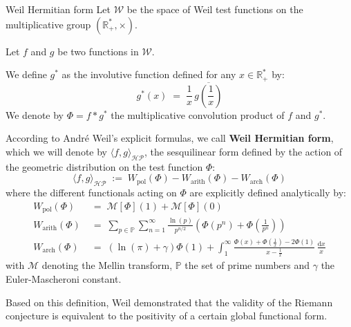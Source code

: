 \documentclass[Riemann_Hypothesis.tex]{subfiles}
\begin{document}
\begin{DefNefEn}[label=df:FormeHermitienneWeil_intro]{Weil Hermitian form}
    Let $\mathcal{W}$ be the space of Weil test functions on the multiplicative 
    group $\left(\mathbb{R}_+^*, \times\right)$. \par
    Let $f$ and $g$ be two functions in $\mathcal{W}$. \par
    We define $g^*$ as the involutive function defined for any $x \in \mathbb{R}_+^*$ by:
    \begin{equation*}
        g^*(x) \;=\; \frac{1}{x} \, \overline{g\left(\frac{1}{x}\right)}
    \end{equation*}
    We denote by $\Phi = f * g^*$ the multiplicative convolution product of $f$ and $g^*$. \par
    According to André Weil's explicit formulas, we call 
    \textbf{Weil Hermitian form}, which we will denote by $\langle f, g \rangle_{\mathcal{HP}}$, the sesquilinear form defined by the action of the geometric distribution on the test function $\Phi$:
    \begin{equation*}
        \langle f, g \rangle_{\mathcal{HP}} \;:=\; W_{\text{pol}}(\Phi) - W_{\text{arith}}(\Phi) - W_{\text{arch}}(\Phi)
    \end{equation*}
    where the different functionals acting on $\Phi$ are explicitly defined analytically by:
    \begin{align*}
        W_{\text{pol}}(\Phi) \;&=\; \mathcal{M}[\Phi](1) + \mathcal{M}[\Phi](0) \\
        W_{\text{arith}}(\Phi) \;&=\; \sum_{p \in \mathbb{P}} \sum_{n=1}^{\infty} \frac{\ln(p)}{p^{n/2}} \left( \Phi(p^n) + \Phi\left(\frac{1}{p^n}\right) \right) \\
        W_{\text{arch}}(\Phi) \;&=\; \left( \ln(\pi) + \gamma \right) \Phi(1) + \int_{1}^{\infty} \frac{\Phi(x) + \Phi\left(\frac{1}{x}\right) - 2\Phi(1)}{x - \frac{1}{x}} \, \frac{\mathrm{d}x}{x}
    \end{align*}
    with $\mathcal{M}$ denoting the Mellin transform, $\mathbb{P}$ the set of prime numbers and $\gamma$ the Euler-Mascheroni constant.
\end{DefNefEn}

Based on this definition, Weil demonstrated that the validity of the Riemann conjecture 
is equivalent to the positivity of a certain global functional form.
\end{document}
